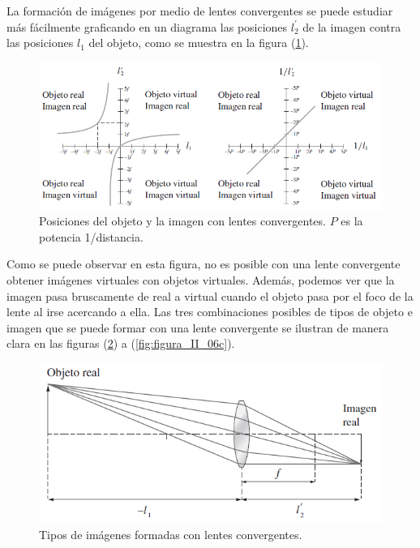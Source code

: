 \documentclass[14pt]{extarticle}
\begin{document}
La formación de imágenes por medio de lentes convergentes se puede estudiar más fácilmente graficando en un diagrama las posiciones $l_{2}^{\prime}$ de la imagen contra las posiciones $l_{1}$ del objeto, como se muestra en la figura (\ref{fig:figura_II_05}).
\begin{figure}[H]
    \centering
    \includegraphics[scale=0.75]{Imagenes/Lentes_06.png}
    \caption{Posiciones del objeto y la imagen con lentes convergentes. $P$ es la potencia 1/distancia.}
    \label{fig:figura_II_05}
\end{figure}
Como se puede observar en esta figura, no es posible con una lente convergente obtener imágenes virtuales con objetos virtuales. Además, podemos ver que la imagen pasa bruscamente de real a virtual cuando el objeto pasa por el foco de la lente al irse acercando a ella. Las tres combinaciones posibles de tipos de objeto e imagen que se puede formar con una lente convergente se ilustran de manera clara en las figuras (\ref{fig:figura_II_06a}) a (\ref{fig:figura_II_06c}).
\begin{figure}[H]
    \centering
    \includegraphics[scale=0.8]{Imagenes/Lentes_07a.png}
    \caption{Tipos de imágenes
formadas con lentes convergentes.}
    \label{fig:figura_II_06a}
\end{figure}
\end{document}
